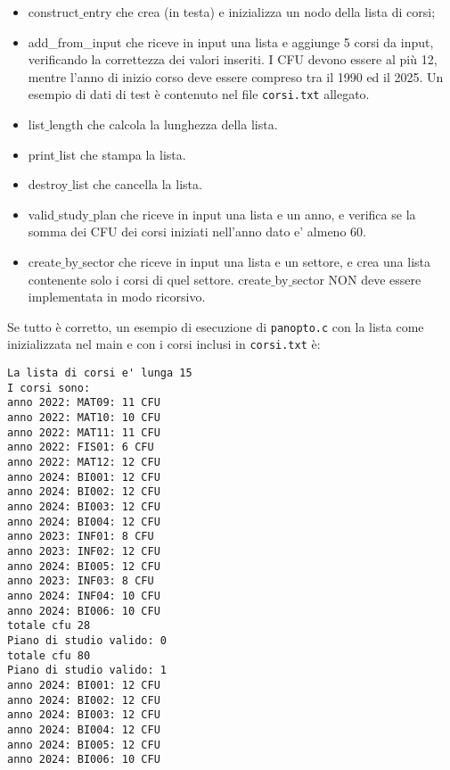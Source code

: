 \documentclass[12pt]{article}
\begin{document}
\begin{itemize}
\item construct$\_$entry  che crea (in testa) e inizializza un nodo della lista di corsi;
\item add\_from\_input che riceve in input una lista e aggiunge 5 corsi da input, verificando la correttezza dei valori inseriti. I CFU devono essere al più 12, mentre l'anno di inizio corso deve essere compreso tra il 1990 ed il 2025. Un esempio di dati di test è contenuto nel file \texttt{corsi.txt} allegato.
\item list$\_$length che calcola la lunghezza della lista.
\item print$\_$list che stampa la lista.
\item destroy$\_$list che cancella la lista.
\item valid$\_$study$\_$plan che riceve in input una lista e un anno, e verifica se la somma dei CFU dei corsi iniziati nell'anno dato e' almeno 60.
\item create$\_$by$\_$sector che riceve in input una lista e un settore, e crea una lista contenente solo i corsi di quel settore.  create$\_$by$\_$sector NON deve essere implementata in modo ricorsivo.

\end{itemize}

Se tutto \`e corretto, un esempio di esecuzione di \texttt{panopto.c} con la lista come inizializzata nel main e con i corsi inclusi in \texttt{corsi.txt} \`e:
\begin{mdframed}[backgroundcolor=verylightgray] 
\begin{verbatim}
La lista di corsi e' lunga 15
I corsi sono:
anno 2022: MAT09: 11 CFU
anno 2022: MAT10: 10 CFU
anno 2022: MAT11: 11 CFU
anno 2022: FIS01: 6 CFU
anno 2022: MAT12: 12 CFU
anno 2024: BI001: 12 CFU
anno 2024: BI002: 12 CFU
anno 2024: BI003: 12 CFU
anno 2024: BI004: 12 CFU
anno 2023: INF01: 8 CFU
anno 2023: INF02: 12 CFU
anno 2024: BI005: 12 CFU
anno 2023: INF03: 8 CFU
anno 2024: INF04: 10 CFU
anno 2024: BI006: 10 CFU
totale cfu 28
Piano di studio valido: 0
totale cfu 80
Piano di studio valido: 1
anno 2024: BI001: 12 CFU
anno 2024: BI002: 12 CFU
anno 2024: BI003: 12 CFU
anno 2024: BI004: 12 CFU
anno 2024: BI005: 12 CFU
anno 2024: BI006: 10 CFU
\end{verbatim}
\end{mdframed}
\end{document}
